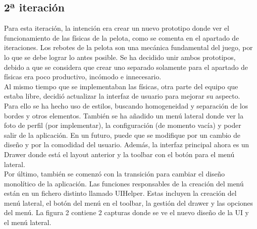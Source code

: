 \documentclass[a4paper,openright,12pt]{article}
\begin{document}
\subsection{2ª iteración}
Para esta iteración, la intención era crear un nuevo prototipo donde ver el funcionamiento de las físicas de la pelota, como se comenta en el apartado de iteraciones. Los rebotes de la pelota son una mecánica fundamental del juego, por lo que se debe lograr lo antes posible. Se ha decidido unir ambos prototipos, debido a que se considera que crear uno separado solamente para el apartado de físicas era poco productivo, incómodo e innecesario. \\ 
Al mismo tiempo que se implementaban las físicas, otra parte del equipo que estaba libre, decidió actualizar la interfaz de usuario para mejorar su aspecto. Para ello se ha hecho uso de estilos, buscando homogeneidad y separación de los bordes y otros elementos. También se ha añadido un menú lateral donde ver la foto de perfil (por implementar), la configuración (de momento vacía) y poder salir de la aplicación. En un futuro, puede que se modifique por un cambio de diseño y por la comodidad del usuario. Además, la interfaz principal ahora es un Drawer donde está el layout anterior y la toolbar con el botón para el menú lateral.\\ 
Por último, también se comenzó con la transición para cambiar el diseño monolítico de la aplicación. Las funciones responsables de la creación del menú están en un fichero distinto llamado UIHelper. Estas incluyen la creación del menú lateral, el botón del menú en el toolbar, la gestión del drawer y las opciones del menú.
La figura 2 contiene 2 capturas donde se ve el nuevo diseño de la UI y el menú lateral.
\end{document}
